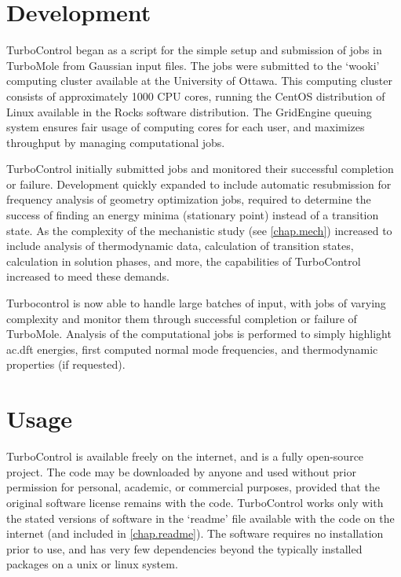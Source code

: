 \section{Development}

TurboControl began as a script for the simple setup and submission of jobs in TurboMole from Gaussian input files. The jobs were submitted to the `wooki' computing cluster available at the University of Ottawa. This computing cluster consists of approximately 1000 CPU cores, running the CentOS distribution of Linux available in the Rocks software distribution. The GridEngine queuing system ensures fair usage of computing cores for each user, and maximizes throughput by managing computational jobs. 

TurboControl initially submitted jobs and monitored their successful completion or failure. Development quickly expanded to include automatic resubmission for frequency analysis of geometry optimization jobs, required to determine the success of finding an energy minima (stationary point) instead of a transition state. As the complexity of the mechanistic study (see \autoref{chap.mech}) increased to include analysis of thermodynamic data, calculation of transition states, calculation in solution phases, and more, the capabilities of TurboControl increased to meed these demands. 

Turbocontrol is now able to handle large batches of input, with jobs of varying complexity and monitor them through successful completion or failure of TurboMole. Analysis of the computational jobs is performed to simply highlight \gls{ac.dft} energies, first computed normal mode frequencies, and thermodynamic properties (if requested). 

\section{Usage}

TurboControl is available freely on the internet, and is a fully open-source project\autocite{bulsink2014}. The code may be downloaded by anyone and used without prior permission for personal, academic, or commercial purposes, provided that the original software license remains with the code. TurboControl works only with the stated versions of software in the `readme' file available with the code on the internet (and included in \autoref{chap.readme}). The software requires no installation prior to use, and has very few dependencies beyond the typically installed packages on a unix or linux system. 

